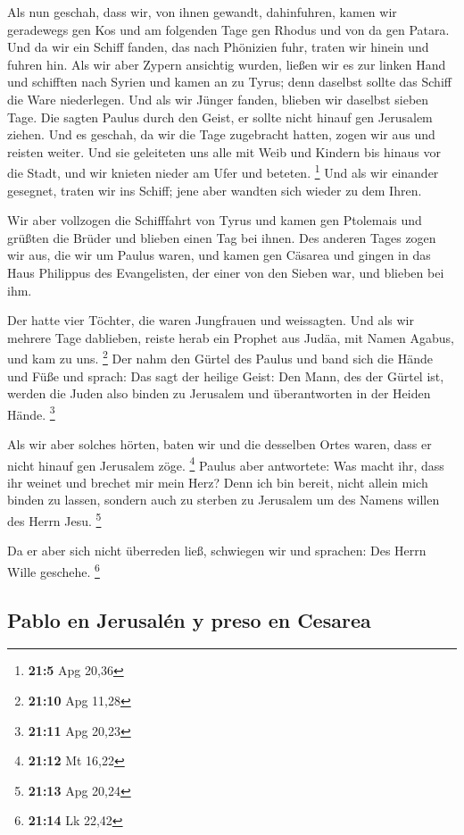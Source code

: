  Als nun geschah, dass wir, von ihnen gewandt,
dahinfuhren, kamen wir geradewegs gen Kos und am folgenden Tage gen
Rhodus und von da gen Patara.  Und da wir ein Schiff
fanden, das nach Phönizien fuhr, traten wir hinein und fuhren hin.
 Als wir aber Zypern ansichtig wurden, ließen wir es zur
linken Hand und schifften nach Syrien und kamen an zu Tyrus; denn
daselbst sollte das Schiff die Ware niederlegen.  Und als
wir Jünger fanden, blieben wir daselbst sieben Tage. Die sagten Paulus
durch den Geist, er sollte nicht hinauf gen Jerusalem ziehen.
 Und es geschah, da wir die Tage zugebracht hatten, zogen
wir aus und reisten weiter. Und sie geleiteten uns alle mit Weib und
Kindern bis hinaus vor die Stadt, und wir knieten nieder am Ufer und
beteten. \footnote{\textbf{21:5} Apg 20,36}  Und als wir
einander gesegnet, traten wir ins Schiff; jene aber wandten sich wieder
zu dem Ihren.

 Wir aber vollzogen die Schifffahrt von Tyrus und kamen
gen Ptolemais und grüßten die Brüder und blieben einen Tag bei ihnen.
 Des anderen Tages zogen wir aus, die wir um Paulus waren,
und kamen gen Cäsarea und gingen in das Haus Philippus des Evangelisten,
der einer von den Sieben war, und blieben bei ihm.

 Der hatte vier Töchter, die waren Jungfrauen und
weissagten.  Und als wir mehrere Tage dablieben, reiste
herab ein Prophet aus Judäa, mit Namen Agabus, und kam zu uns.
\footnote{\textbf{21:10} Apg 11,28}  Der nahm den Gürtel
des Paulus und band sich die Hände und Füße und sprach: Das sagt der
heilige Geist: Den Mann, des der Gürtel ist, werden die Juden also
binden zu Jerusalem und überantworten in der Heiden Hände. \footnote{\textbf{21:11}
  Apg 20,23}

 Als wir aber solches hörten, baten wir und die desselben
Ortes waren, dass er nicht hinauf gen Jerusalem zöge. \footnote{\textbf{21:12}
  Mt 16,22}  Paulus aber antwortete: Was macht ihr, dass
ihr weinet und brechet mir mein Herz? Denn ich bin bereit, nicht allein
mich binden zu lassen, sondern auch zu sterben zu Jerusalem um des
Namens willen des Herrn Jesu. \footnote{\textbf{21:13} Apg 20,24}

 Da er aber sich nicht überreden ließ, schwiegen wir und
sprachen: Des Herrn Wille geschehe. \footnote{\textbf{21:14} Lk 22,42}

\hypertarget{pablo-en-jerusaluxe9n-y-preso-en-cesarea}{%
\subsection{Pablo en Jerusalén y preso en
Cesarea}\label{pablo-en-jerusaluxe9n-y-preso-en-cesarea}}

